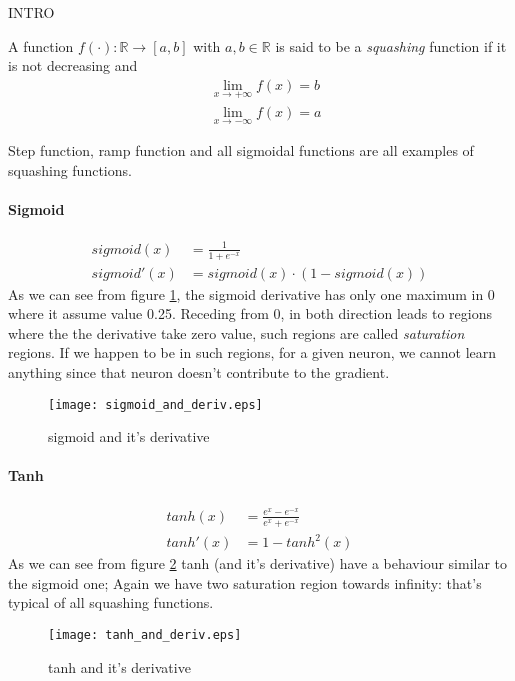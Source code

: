 INTRO

\begin{defn}
A function $f(\cdot):\mathbb{R}\rightarrow[a,b]$ with $a,b \in \mathbb{R}$ is said to be a \textit{squashing} function if it is not decreasing and 
\begin{align}
&\lim_{x \to +\infty} f(x) = b \\
& \lim_{x \to -\infty} f(x) = a 
\end{align}
\end{defn}
Step function, ramp function and all sigmoidal functions are all examples of squashing functions.

\paragraph{Sigmoid}

\begin{align}
sigmoid(x)&= \frac{1}{1+e^{-x}}  \\ 
sigmoid'(x)&= sigmoid(x) \cdot (1-sigmoid(x))
\end{align}
As we can see from figure \ref{sigmoid_plot}, the sigmoid derivative has only one maximum in 0 where it assume value 0.25. Receding from 0, in both direction leads to regions where
the the derivative take zero value, such regions are called \textit{saturation} regions. If we happen to be in such regions, for a given neuron, we cannot learn anything since that neuron doesn't contribute
to the gradient.

\begin{figure}[h]
  \centering
    \texttt{[image: sigmoid\_and\_deriv.eps]}
  \caption{sigmoid and it's derivative}
\label{sigmoid_plot}
\end{figure}

\paragraph{Tanh}
\begin{align}
 tanh(x)&=\frac{e^x-e^{-x}}{e^x+e^{-x}} \\
 tanh'(x)&= 1 - tanh^2(x)  
\end{align}
As we can see from figure \ref{tanh_plot} tanh (and it's derivative) have a behaviour similar to the sigmoid one; Again we have two saturation region towards
infinity: that's typical of all squashing functions.



\begin{figure}[h]
  \centering
    \texttt{[image: tanh\_and\_deriv.eps]}
  \caption{tanh and it's derivative}
\label{tanh_plot}
\end{figure}

